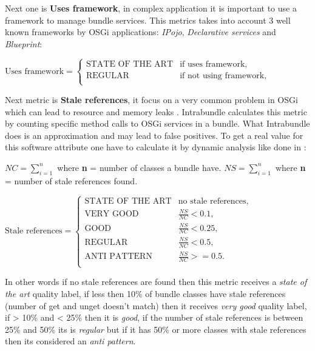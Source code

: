 Next one is \textbf{Uses framework}, in complex application it is important to use a framework to manage bundle services. This metrics takes into account 3 well known frameworks by OSGi applications: \emph{IPojo}, \emph{Declarative services} and \emph{Blueprint}: \newline

\(\text{Uses framework}=\begin{cases}
\text{STATE OF THE ART}& \text{if uses framework},\\
\text{REGULAR}& \text{if not using framework}, \\
\end{cases} \)  \newline

Next metric is \textbf{Stale references}, it focus on a very common problem in OSGi which can lead to resource and memory leaks \citep{Gama 2011}. Intrabundle calculates this metric by counting specific method calls to OSGi services in a bundle. What Intrabundle does is an approximation and may lead to false positives. To get a real value for this software attribute one have to calculate it by dynamic analysis like done in \citep{Gama 2012}:\newline

\(NC = \sum_{i=1}^{n} \) where \textbf{n} = number of classes a bundle have. \newline
\(NS = \sum_{i=1}^{n} \) where \textbf{n} = number of stale references found. \newline

\(\text{Stale references}=\begin{cases}
\text{STATE OF THE ART}& \text{no stale references},\\
\text{VERY GOOD}& \frac{NS}{NC} < 0.1, \\
\text{GOOD}& \frac{NS}{NC} < 0.25, \\
\text{REGULAR}& \frac{NS}{NC} < 0.5, \\
\text{ANTI PATTERN}& \frac{NS}{NC} >= 0.5. \\
\end{cases} \)\newline     

In other words if no stale references are found then this metric receives a \emph{state of the art} quality label, if less then 10\% of bundle classes have stale references (number of get and unget doesn't match) then it receives \emph{very good} quality label, if > 10\% and < 25\% then it is \emph{good}, if the number of stale references is between 25\% and 50\% its is \emph{regular} but if it has 50\% or more classes with stale references then its considered an \emph{anti pattern}. 


